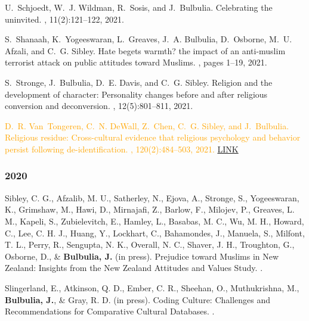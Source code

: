 \documentclass{article}
\begin{document}
\begin{thebibliography}{99}
  
U.~Schjoedt, W.~J. Wildman, R.~Sosis, and J.~Bulbulia.
\newblock Celebrating the uninvited.
, 11(2):121--122, 2021.



S.~Shanaah, K.~Yogeeswaran, L.~Greaves, J.~A. Bulbulia, D.~Osborne, M.~U.
  Afzali, and C.~G. Sibley.
\newblock Hate begets warmth? the impact of an anti-muslim terrorist attack on
  public attitudes toward Muslims.
, pages 1--19, 2021.


S.~Stronge, J.~Bulbulia, D.~E. Davis, and C.~G. Sibley.
\newblock Religion and the development of character: Personality changes before
  and after religious conversion and deconversion.
, 12(5):801--811,
  2021.


\textcolor{Orange}{D.~R. Van~Tongeren, C.~N. DeWall, Z.~Chen, C.~G. Sibley, and J.~Bulbulia.
\newblock Religious residue: {Cross}-cultural evidence that religious
  psychology and behavior persist following de-identification.
, 120(2):484--503,
  2021.} \href{https://www.dropbox.com/s/dyxqtxui4fqvy5u/VanTongerenEtAL2021JPSP.pdf?dl=0}{LINK}





\subsubsection*{2020}


 Sibley, C. G., Afzalib, M. U., Satherley, N., Ejova, A., Stronge, S., Yogeeswaran, K., Grimshaw, M., Hawi, D., Mirnajafi, Z., Barlow, F., Milojev, P., Greaves, L. M., Kapeli, S., Zubielevitch, E., Hamley, L., Basabas, M. C., Wu, M. H., Howard, C., Lee, C. H. J., Huang, Y., Lockhart, C., Bahamondes, J., Manuela, S., Milfont, T. L., Perry, R., Sengupta, N. K., Overall, N. C., Shaver, J. H., Troughton, G., Osborne, D., \& {\bf Bulbulia, J.} (in press). 
\newblock Prejudice toward Muslims in New Zealand: Insights from the New Zealand Attitudes and Values Study.
.


 Slingerland, E., Atkinson, Q. D., Ember, C. R., Sheehan, O., Muthukrishna, M., {\bf Bulbulia, J.}, \& Gray, R. D. (in press). 
\newblock Coding Culture: Challenges and Recommendations for Comparative Cultural Databases.
. 



\end{thebibliography}
\end{document}
